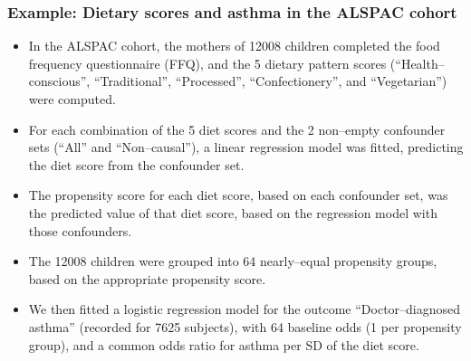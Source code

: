 \documentclass[11pt]{beamer}
\begin{document}
\begin{frame}
\frametitle{Example: Dietary scores and asthma in the ALSPAC cohort}

\begin{itemize}

\item<2-> In the ALSPAC cohort, the mothers of 12008 children completed the food frequency questionnaire (FFQ),
and the 5 dietary pattern scores (``Health--conscious'', ``Traditional'', ``Processed'', ``Confectionery'', and ``Vegetarian'')
were computed.

\item<3-> For each combination of the 5 diet scores and the 2 non--empty confounder sets (``All'' and ``Non--causal''),
a linear regression model was fitted, predicting the diet score from the confounder set.

\item<4-> The propensity score for each diet score, based on each confounder set,
was the predicted value of that diet score, based on the regression model with those confounders.

\item<5-> The 12008 children were grouped into 64 nearly--equal propensity groups,
based on the appropriate propensity score.

\item<6-> We then fitted a logistic regression model for the outcome ``Doctor--diagnosed asthma''
(recorded for 7625 subjects),
with 64 baseline odds (1 per propensity group), and a common odds ratio for asthma per SD of the diet score.

\end{itemize}

\end{frame}
\end{document}

